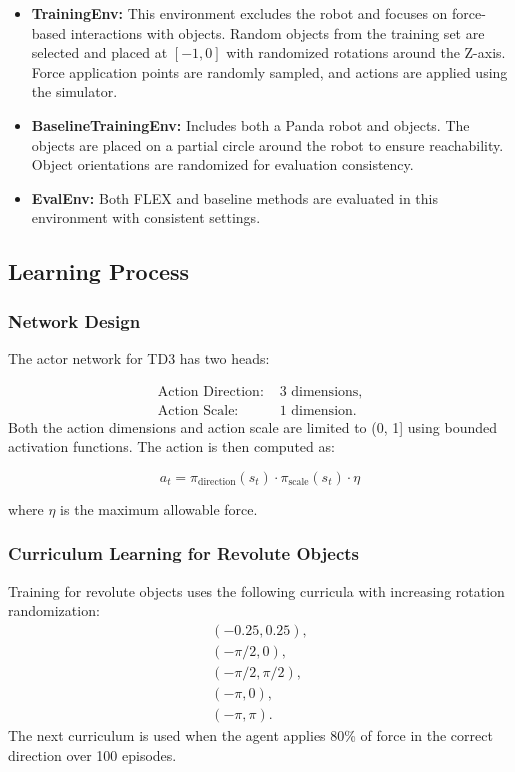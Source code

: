 \begin{itemize}
    \item \textbf{TrainingEnv:} This environment excludes the robot and focuses on force-based interactions with objects. Random objects from the training set are selected and placed at \([-1, 0]\) with randomized rotations around the Z-axis. Force application points are randomly sampled, and actions are applied using the simulator. 
    \item \textbf{BaselineTrainingEnv:} Includes both a Panda robot and objects. The objects are placed on a partial circle around the robot to ensure reachability. Object orientations are randomized for evaluation consistency.
    \item \textbf{EvalEnv:} Both FLEX and baseline methods are evaluated in this environment with consistent settings.
\end{itemize}

\subsection{Learning Process}

\subsubsection{Network Design}
The actor network for TD3 has two heads:

\[
\begin{aligned}
\text{Action Direction: } & \text{3 dimensions}, \\
\text{Action Scale: } & \text{1 dimension}.
\end{aligned}
\]
Both the action dimensions and action scale are limited to (0, 1] using bounded activation functions.
The action is then computed as:

\[
a_t = \pi_{\text{direction}}(s_t) \cdot \pi_{\text{scale}}(s_t) \cdot \eta
\]

where \(\eta\) is the maximum allowable force.

\subsubsection{Curriculum Learning for Revolute Objects}
Training for revolute objects uses the following curricula with increasing rotation randomization:
% 
\[
\begin{gathered}
(-0.25, 0.25), \\
(-\pi/2, 0), \\
(-\pi/2, \pi/2), \\
(-\pi, 0), \\
(-\pi, \pi).
\end{gathered}
\]
% 
The next curriculum is used when the agent applies 80\% of force in the correct direction over 100 episodes. 
